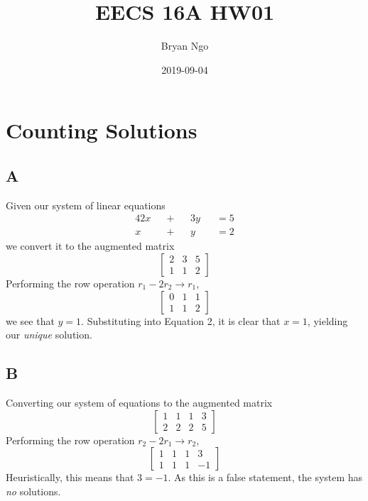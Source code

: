 \documentclass[]{article}
\title{EECS 16A HW01}
\author{Bryan Ngo}
\date{2019-09-04}
\begin{document}
\maketitle

\section{Counting Solutions}

\subsection{A}

Given our system of linear equations
\begin{alignat}{4}
	2x && + && 3y && = 5 \\
	x && + && y && =2
\end{alignat}
we convert it to the augmented matrix 
\begin{equation}
	\left[
	\begin{array}{cc|c}
	2 & 3 & 5 \\
	1 & 1 & 2
	\end{array}
	\right]
\end{equation}
Performing the row operation \(r_1 - 2r_2 \to r_1\),
\begin{equation}
	\left[
	\begin{array}{cc|c}
	0 & 1 & 1 \\
	1 & 1 & 2
	\end{array}
	\right]
\end{equation}
we see that \(\boxed{y = 1}\). Substituting into Equation 2, it is clear that \(\boxed{x = 1}\), yielding our \emph{unique} solution. 

\subsection{B}

Converting our system of equations to the augmented matrix
\begin{equation}
	\left[
	\begin{array}{ccc|c}
	1 & 1 & 1 & 3 \\
	2 & 2 & 2 & 5
	\end{array}
	\right]
\end{equation}
Performing the row operation \(r_2 - 2r_1 \to r_2\),
\begin{equation}
	\left[
	\begin{array}{ccc|c}
	1 & 1 & 1 & 3 \\
	1 & 1 & 1 & -1
	\end{array}
	\right]
\end{equation}
Heuristically, this means that \(3 = -1\). As this is a false statement, the system has \emph{no} solutions. 
\end{document}
